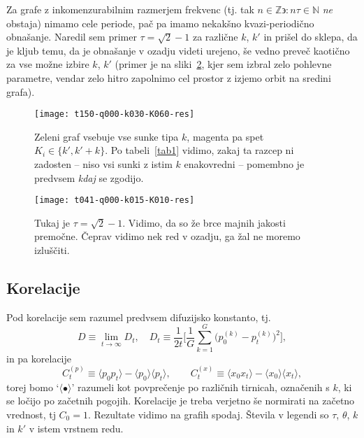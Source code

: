 \documentclass[a4paper, 12pt]{article}
\begin{document}
Za grafe z inkomenzurabilnim razmerjem frekvenc (tj. tak $n \in \mathbb{Z} \backepsilon: n\tau \in \mathbb{N}$ \emph{ne}
obstaja) nimamo cele periode, pa\v c pa imamo nekak\v sno kvazi-periodi\v cno obna\v sanje. Naredil sem primer
$\tau = \sqrt{2} - 1$ za razli\v cne $k$, $k'$ in pri\v sel do sklepa, da je kljub temu, da je obna\v sanje v ozadju videti
urejeno, \v se vedno preve\v c kaoti\v cno za vse mo\v zne izbire $k$, $k'$ (primer je na sliki~\ref{graf4}, kjer sem
izbral zelo pohlevne parametre, vendar zelo hitro zapolnimo cel prostor z izjemo orbit na sredini grafa).
\begin{landscape}
\begin{figure}[H]\centering
	\texttt{[image: t150-q000-k030-K060-res]}
	\caption{Zeleni graf vsebuje vse sunke tipa $k$, magenta pa spet $K_i \in \{k', k' + k\}$. Po tabeli~\ref{tab1}
		vidimo, zakaj ta razcep ni zadosten -- niso vsi sunki z istim $k$ enakovredni -- pomembno je predvsem
		\emph{kdaj} se zgodijo.}
	\label{graf3}
\end{figure}

\begin{figure}[H]\centering
	\texttt{[image: t041-q000-k015-K010-res]}
	\caption{Tukaj je $\tau = \sqrt{2}-1$. Vidimo, da so \v ze brce majnih jakosti premo\v cne. \v Ceprav vidimo nek
		red v ozadju, ga \v zal ne moremo izlu\v s\v citi.}
	\label{graf4}
\end{figure}
\end{landscape}

\subsection{Korelacije}

Pod korelacije sem razumel predvsem difuzijsko konstanto, tj.
\begin{equation}
	D \equiv \lim_{t \to \infty} D_t, \quad D_t \equiv \frac{1}{2t}\bigg[ \frac{1}{G}\sum_{k = 1}^G \big(p_0^{(k)} -
		p_t^{(k)}\big)^2\bigg],
\end{equation}
in pa korelacije
\begin{equation}
	C_t^{(p)} \equiv \langle p_0 p_t \rangle - \langle p_0 \rangle\langle p_t\rangle,
	\qquad C_t^{(x)} \equiv \langle x_0 x_t \rangle - \langle x_0 \rangle\langle x_t \rangle,
\end{equation}
torej bomo `$\langle \bullet \rangle$' razumeli kot povpre\v cenje po razli\v cnih tirnicah, ozna\v cenih s $k$, ki se
lo\v cijo po za\v cetnih pogojih. Korelacije je treba verjetno \v se normirati na za\v cetno vrednost, tj $C_0 = 1$.
Rezultate vidimo na grafih spodaj. \v Stevila v legendi so $\tau$, $\theta$, $k$ in $k'$ v istem vrstnem redu.
\end{document}
